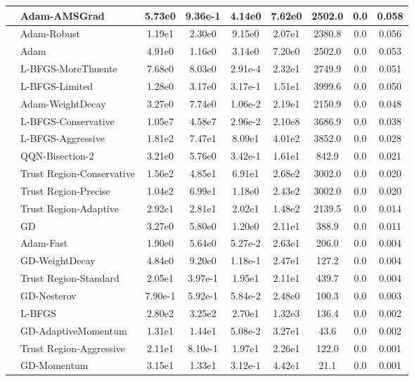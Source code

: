 \documentclass{article}
\begin{document}
\begin{longtable}{|l|l|c|c|c|c|c|c|c|}
\hline
 & Adam-AMSGrad & 5.73e0 & 9.36e-1 & 4.14e0 & 7.62e0 & 2502.0 & 0.0 & 0.058 \\
\hline
 & Adam-Robust & 1.19e1 & 2.30e0 & 9.15e0 & 2.07e1 & 2380.8 & 0.0 & 0.056 \\
\hline
 & Adam & 4.91e0 & 1.16e0 & 3.14e0 & 7.20e0 & 2502.0 & 0.0 & 0.053 \\
\hline
 & L-BFGS-MoreThuente & 7.68e0 & 8.03e0 & 2.91e-4 & 2.32e1 & 2749.9 & 0.0 & 0.051 \\
\hline
 & L-BFGS-Limited & 1.28e0 & 3.17e0 & 3.17e-1 & 1.51e1 & 3999.6 & 0.0 & 0.050 \\
\hline
 & Adam-WeightDecay & 3.27e0 & 7.74e0 & 1.06e-2 & 2.19e1 & 2150.9 & 0.0 & 0.048 \\
\hline
 & L-BFGS-Conservative & 1.05e7 & 4.58e7 & 2.96e-2 & 2.10e8 & 3686.9 & 0.0 & 0.038 \\
\hline
 & L-BFGS-Aggressive & 1.81e2 & 7.47e1 & 8.09e1 & 4.01e2 & 3852.0 & 0.0 & 0.028 \\
\hline
 & QQN-Bisection-2 & 3.21e0 & 5.76e0 & 3.42e-1 & 1.61e1 & 842.9 & 0.0 & 0.021 \\
\hline
 & Trust Region-Conservative & 1.56e2 & 4.85e1 & 6.91e1 & 2.68e2 & 3002.0 & 0.0 & 0.020 \\
\hline
 & Trust Region-Precise & 1.04e2 & 6.99e1 & 1.18e0 & 2.43e2 & 3002.0 & 0.0 & 0.020 \\
\hline
 & Trust Region-Adaptive & 2.92e1 & 2.81e1 & 2.02e1 & 1.48e2 & 2139.5 & 0.0 & 0.014 \\
\hline
 & GD & 3.27e0 & 5.80e0 & 1.20e0 & 2.11e1 & 388.9 & 0.0 & 0.011 \\
\hline
 & Adam-Fast & 1.90e0 & 5.64e0 & 5.27e-2 & 2.63e1 & 206.0 & 0.0 & 0.004 \\
\hline
 & GD-WeightDecay & 4.84e0 & 9.20e0 & 1.18e-1 & 2.47e1 & 127.2 & 0.0 & 0.004 \\
\hline
 & Trust Region-Standard & 2.05e1 & 3.97e-1 & 1.95e1 & 2.11e1 & 439.7 & 0.0 & 0.004 \\
\hline
 & GD-Nesterov & 7.90e-1 & 5.92e-1 & 5.84e-2 & 2.48e0 & 100.3 & 0.0 & 0.003 \\
\hline
 & L-BFGS & 2.80e2 & 3.25e2 & 2.70e1 & 1.32e3 & 136.4 & 0.0 & 0.002 \\
\hline
 & GD-AdaptiveMomentum & 1.31e1 & 1.44e1 & 5.08e-2 & 3.27e1 & 43.6 & 0.0 & 0.002 \\
\hline
 & Trust Region-Aggressive & 2.11e1 & 8.10e-1 & 1.97e1 & 2.26e1 & 122.0 & 0.0 & 0.001 \\
\hline
 & GD-Momentum & 3.15e1 & 1.33e1 & 3.12e-1 & 4.42e1 & 21.1 & 0.0 & 0.001 \\

\end{longtable}
\end{document}
